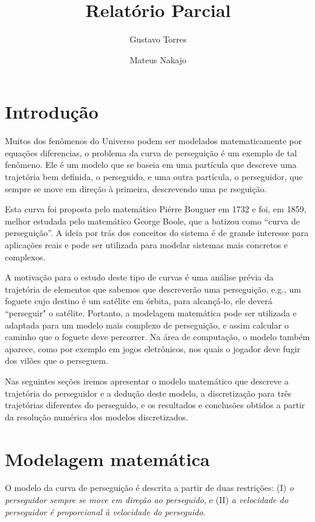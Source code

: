 \documentclass[a4paper,10pt]{article}
\title{Relatório Parcial}
\author{Gustavo Torres \and Mateus Nakajo}
\begin{document}
\maketitle

\section{Introdução}
  Muitos dos fenômenos do Universo podem ser modelados matematicamente por equações diferencias, o problema da curva de perseguição é um exemplo de tal fenômeno. Ele é um modelo que se baseia em uma partícula que descreve uma trajetória bem definida, o perseguido, e uma outra partícula, o perseguidor, que sempre se move em direção à primeira, descrevendo uma pe																																																															rseguição.
  
  Esta curva foi proposta pelo matemático Piérre Bouguer em 1732 e foi, em 1859, melhor estudada pelo matemático George Boole, que a batizou como “curva de perseguição”. 
  A ideia por trás dos conceitos do sistema é de grande interesse para  aplicações reais e pode ser utilizada para modelar sistemas mais concretos e complexos.
  
  A motivação para o estudo deste tipo de curvas é uma análise prévia da trajetória de elementos que sabemos que descreverão uma perseguição, e.g., um foguete cujo destino é um satélite em órbita, para alcançá-lo, ele deverá ``perseguir" o satélite. Portanto, a modelagem matemática pode ser utilizada e adaptada para um modelo mais complexo de perseguição, e assim calcular o caminho que o foguete deve percorrer. Na área de computação, o modelo também aparece, como por exemplo em jogos eletrônicos, nos quais o jogador deve fugir dos vilões que o perseguem. 
  
  Nas seguintes seções iremos apresentar o modelo matemático que descreve a trajetória do perseguidor e a dedução deste modelo, a discretização para três trajetórias diferentes do perseguido, e os resultados e conclusões obtidos a partir da resolução numérica dos modelos discretizados.
  
\section{Modelagem matemática}
  O modelo da curva de perseguição é descrita a partir de duas restrições\cite{lloyd}: (I) \emph{o perseguidor sempre se move em direção ao perseguido}, e (II) \emph{a velocidade do perseguidor é proporcional à velocidade do perseguido}.
  
\end{document}
